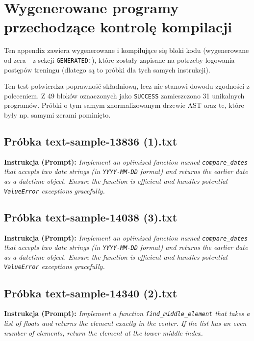 \section{Wygenerowane programy przechodzące kontrolę kompilacji}
\label{app:kody-kompilowalne}

Ten appendix zawiera wygenerowane i kompilujące się bloki kodu (wygenerowane od zera - z sekcji \texttt{GENERATED:}), które zostały zapisane na potrzeby logowania postępów treningu (dlatego są to próbki dla tych samych instrukcji).

Ten test potwierdza poprawność składniową, lecz nie stanowi dowodu zgodności z poleceniem. Z 49 bloków oznaczonych jako \texttt{SUCCESS} zamieszczono 31 unikalnych programów. Próbki o tym samym znormalizowanym drzewie AST oraz te, które były np. samymi zerami pominięto.


\subsection{Próbka text-sample-13836 (1).txt}
\label{sec:lst:text-sample-13836-1}
\textbf{Instrukcja (Prompt):} \textit{Implement an optimized function named \texttt{compare\_dates} that accepts two date strings (in \texttt{YYYY-MM-DD} format) and returns the earlier date as a datetime object. Ensure the function is efficient and handles potential \texttt{ValueError} exceptions gracefully.}




\subsection{Próbka text-sample-14038 (3).txt}
\label{sec:lst:text-sample-14038-3}
\textbf{Instrukcja (Prompt):} \textit{Implement an optimized function named \texttt{compare\_dates} that accepts two date strings (in \texttt{YYYY-MM-DD} format) and returns the earlier date as a datetime object. Ensure the function is efficient and handles potential \texttt{ValueError} exceptions gracefully.}




\subsection{Próbka text-sample-14340 (2).txt}
\label{sec:lst:text-sample-14340-2}
\textbf{Instrukcja (Prompt):} \textit{Implement a function \texttt{find\_middle\_element} that takes a list of floats and returns the element exactly in the center. If the list has an even number of elements, return the element at the lower middle index.}

